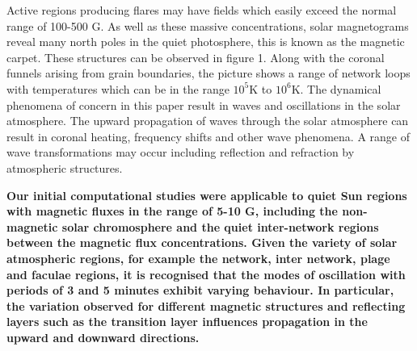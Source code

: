 \documentclass[linenumbers]{aastex63}
\newcommand{\bcr}{\bf\color{red}} %
\begin{document}
Active regions producing flares may have fields which easily exceed the normal range of 100-500 G. As well as these massive concentrations, solar magnetograms reveal many north poles in the quiet photosphere, this is known as the magnetic carpet. These structures can be observed in figure 1. Along with the coronal funnels arising from grain boundaries, the picture shows a range of network loops with temperatures which can be in the range $10^{5}$K to $10^{6}$K. The dynamical phenomena of concern in this paper result in waves and oscillations in the solar atmosphere. The upward propagation of waves through the solar atmosphere can result in coronal heating, frequency shifts and other wave phenomena. A range of wave transformations may occur including reflection and refraction by atmospheric structures. 

{\bcr
Our initial computational studies were applicable to quiet Sun regions with magnetic fluxes in the range of 5-10 G, including the non-magnetic solar chromosphere and the quiet inter-network regions between the magnetic flux concentrations. Given the variety of solar atmospheric regions, for example the network, inter network, plage and faculae regions, it is recognised that the modes of oscillation with periods of 3 and 5 minutes exhibit varying behaviour. In particular, the variation observed for different magnetic structures and reflecting layers such as the transition layer influences propagation in the upward and downward directions.
}


\end{document}
